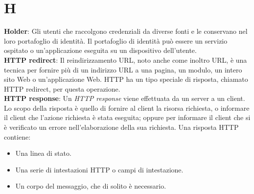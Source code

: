 \section{H}
\textbf{Holder}: Gli utenti che raccolgono credenziali da diverse fonti e le conservano nel loro portafoglio di identità. Il portafoglio di identità può essere un servizio ospitato o un'applicazione eseguita su un dispositivo dell'utente.\\
\textbf{HTTP redirect}: Il reindirizzamento URL, noto anche come inoltro URL, è una tecnica per fornire più di un indirizzo URL a una pagina, un modulo, un intero sito Web o un'applicazione Web. 
HTTP ha un tipo speciale di risposta, chiamato HTTP redirect, per questa operazione.\\
\textbf{HTTP response}: Un\textit{ HTTP response} viene effettuata da un server a un client. Lo scopo della risposta è quello di fornire al client la risorsa richiesta,
o informare il client che l'azione richiesta è stata eseguita; oppure per informare il client che si è verificato un errore nell'elaborazione della sua richiesta.
Una risposta HTTP contiene:
\begin{itemize}
    \item Una linea di stato.
    \item Una serie di intestazioni HTTP o campi di intestazione.
    \item Un corpo del messaggio, che di solito è necessario.
\end{itemize}
